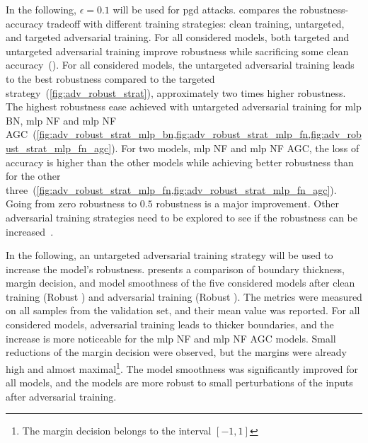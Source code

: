 \documentclass[../main.tex]{subfiles}
\begin{document}
		In the following, \(\epsilon = 0.1\) will be used for \gls{pgd} attacks.
		 compares the robustness-accuracy tradeoff with different training strategies: clean training, untargeted, and targeted adversarial training.
		For all considered models, both targeted and untargeted adversarial training improve robustness while sacrificing some clean accuracy~().
		For all considered models, the untargeted adversarial training leads to the best robustness compared to the targeted strategy~(\cref{fig:adv_robust_strat}), approximately two times higher robustness.
		The highest robustness ease achieved with untargeted adversarial training for \gls{mlp} BN, \gls{mlp} NF and \gls{mlp} NF AGC~(\cref{fig:adv_robust_strat_mlp_bn,fig:adv_robust_strat_mlp_fn,fig:adv_robust_strat_mlp_fn_agc}).
		For two models, \gls{mlp} NF and \gls{mlp} NF AGC, the loss of accuracy is higher than the other models while achieving better robustness than for the other three~(\cref{fig:adv_robust_strat_mlp_fn,fig:adv_robust_strat_mlp_fn_agc}).
		Going from zero robustness to \(0.5\) robustness is a major improvement.
		Other adversarial training strategies need to be explored to see if the robustness can be increased~\cite{AdvTrainSurvey}.

		In the following, an untargeted adversarial training strategy will be used to increase the model's robustness.
		 presents a comparison of boundary thickness, margin decision, and model smoothness of the five considered models after clean training (Robust \xmark) and adversarial training (Robust \cmark).
		The metrics were measured on all samples from the validation set, and their mean value was reported.
		For all considered models, adversarial training leads to thicker boundaries, and the increase is more noticeable for the \gls{mlp} NF and \gls{mlp} NF AGC models.
		Small reductions of the margin decision were observed, but the margins were already high and almost maximal\footnote{The margin decision belongs to the interval \(\left[-1, 1\right]\)}.
		The model smoothness was significantly improved for all models, and the models are more robust to small perturbations of the inputs after adversarial training.
\end{document}
